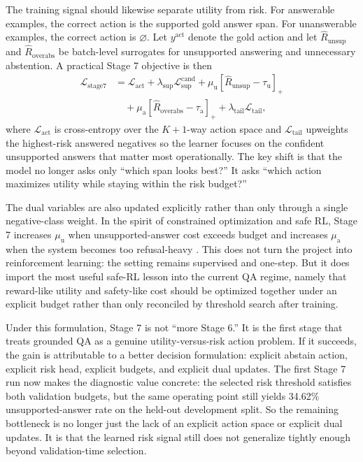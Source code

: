 The training signal should likewise separate utility from risk.
For answerable examples, the correct action is the supported gold answer span.
For unanswerable examples, the correct action is \(\varnothing\).
Let \(y^{\mathrm{act}}\) denote the gold action and let
\(\hat{R}_{\mathrm{unsup}}\)
and
\(\hat{R}_{\mathrm{overabs}}\)
be batch-level surrogates for unsupported answering and unnecessary
abstention.
A practical Stage 7 objective is then
\begin{align}
  \mathcal{L}_{\mathrm{stage7}}
  &=
  \mathcal{L}_{\mathrm{act}}
  +
  \lambda_{\mathrm{sup}} \mathcal{L}_{\mathrm{sup}}^{\mathrm{cand}}
  +
  \mu_{\mathrm{u}} \left[\hat{R}_{\mathrm{unsup}} - \tau_{\mathrm{u}}\right]_{+} \\
  &\quad +
  \mu_{\mathrm{a}} \left[\hat{R}_{\mathrm{overabs}} - \tau_{\mathrm{a}}\right]_{+}
  +
  \lambda_{\mathrm{tail}} \mathcal{L}_{\mathrm{tail}},
\end{align}
where \(\mathcal{L}_{\mathrm{act}}\) is cross-entropy over the
\(K+1\)-way action space and
\(\mathcal{L}_{\mathrm{tail}}\)
upweights the highest-risk answered negatives so the learner focuses on the
confident unsupported answers that matter most operationally.
The key shift is that the model no longer asks only
``which span looks best?''
It asks
``which action maximizes utility while staying within the risk budget?''

The dual variables are also updated explicitly rather than only through a
single negative-class weight.
In the spirit of constrained optimization and safe RL, Stage 7 increases
\(\mu_{\mathrm{u}}\)
when unsupported-answer cost exceeds budget and increases
\(\mu_{\mathrm{a}}\)
when the system becomes too refusal-heavy
\citep{cotter2019optimization,liu2022cvpo}.
This does not turn the project into reinforcement learning:
the setting remains supervised and one-step.
But it does import the most useful safe-RL lesson into the current QA regime,
namely that reward-like utility and safety-like cost should be optimized
together under an explicit budget rather than only reconciled by threshold
search after training.

Under this formulation, Stage 7 is not ``more Stage 6.''
It is the first stage that treats grounded QA as a genuine
utility-versus-risk action problem.
If it succeeds, the gain is attributable to a better decision formulation:
explicit abstain action, explicit risk head, explicit budgets, and explicit
dual updates.
The first Stage 7 run now makes the diagnostic value concrete:
the selected risk threshold satisfies both validation budgets, but the same
operating point still yields 34.62\% unsupported-answer rate on the held-out
development split.
So the remaining bottleneck is no longer just the lack of an explicit action
space or explicit dual updates.
It is that the learned risk signal still does not generalize tightly enough
beyond validation-time selection.

